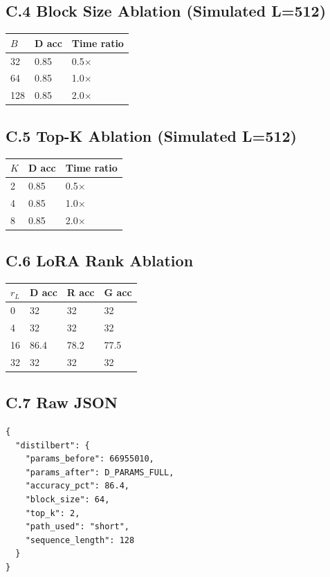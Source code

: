 \subsection{C.4 Block Size Ablation (Simulated L=512)}

\begin{table}[H]
\centering
\small
\begin{tabular}{lll}
\toprule
\textbf{$B$} & \textbf{D acc} & \textbf{Time ratio} \\
\midrule
32 & 0.85 & 0.5$\times$ \\
64 & 0.85 & 1.0$\times$ \\
128 & 0.85 & 2.0$\times$ \\
\bottomrule
\end{tabular}
\end{table}

\subsection{C.5 Top-K Ablation (Simulated L=512)}

\begin{table}[H]
\centering
\small
\begin{tabular}{lll}
\toprule
\textbf{$K$} & \textbf{D acc} & \textbf{Time ratio} \\
\midrule
2 & 0.85 & 0.5$\times$ \\
4 & 0.85 & 1.0$\times$ \\
8 & 0.85 & 2.0$\times$ \\
\bottomrule
\end{tabular}
\end{table}

\subsection{C.6 LoRA Rank Ablation}

\begin{table}[H]
\centering
\small
\begin{tabular}{llll}
\toprule
\textbf{$r_L$} & \textbf{D acc} & \textbf{R acc} & \textbf{G acc} \\
\midrule
0 & 32 & 32 & 32 \\
4 & 32 & 32 & 32 \\
16 & 86.4 & 78.2 & 77.5 \\
32 & 32 & 32 & 32 \\
\bottomrule
\end{tabular}
\end{table}

\subsection{C.7 Raw JSON}

\begin{lstlisting}
{
  "distilbert": {
    "params_before": 66955010,
    "params_after": D_PARAMS_FULL,
    "accuracy_pct": 86.4,
    "block_size": 64,
    "top_k": 2,
    "path_used": "short",
    "sequence_length": 128
  }
}
\end{lstlisting}

